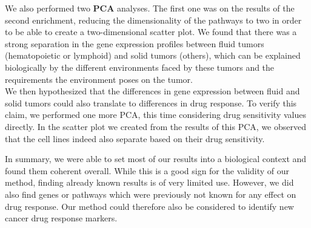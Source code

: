 We also performed two \textbf{PCA} analyses. The first one was on the results of the second enrichment, reducing the dimensionality of the pathways to two in order to be able to create a two-dimensional scatter plot.
We found that there was a strong separation in the gene expression profiles between fluid tumors (hematopoietic or lymphoid) and solid tumors (others), which can be explained biologically by the different environments faced by these tumors and the requirements the environment poses on the tumor.\\
We then hypothesized that the differences in gene expression between fluid and solid tumors could also translate to differences in drug response.
To verify this claim, we performed one more PCA, this time considering drug sensitivity values directly.
In the scatter plot we created from the results of this PCA, we observed that the cell lines indeed also separate based on their drug sensitivity.

In summary, we were able to set most of our results into a biological context and found them coherent overall. While this is a good sign for the validity of our method, finding already known results is of very limited use. However, we did also find genes or pathways which were previously not known for any effect on drug response. Our method could therefore also be considered to identify new cancer drug response markers.

